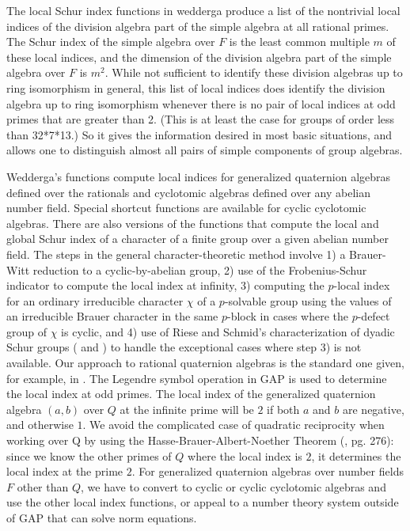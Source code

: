 \documentclass[a4paper,11pt]{report}
\begin{document}
{{ The local Schur index functions in wedderga produce a list of the nontrivial
local indices of the division algebra part of the simple algebra at all
rational primes. The Schur index of the simple algebra over $F$ is the least common multiple $m$ of these local indices, and the dimension of the division algebra part of the
simple algebra over $F$ is $m^2$. While not sufficient to identify these division algebras up to ring
isomorphism in general, this list of local indices does identify the division
algebra up to ring isomorphism whenever there is no pair of local indices at
odd primes that are greater than 2. (This is at least the case for groups of
order less than 3\texttt{}2*7*13.) So it gives the information
desired in most basic situations, and allows one to distinguish almost all
pairs of simple components of group algebras. 

 Wedderga's functions compute local indices for generalized quaternion algebras
defined over the rationals and cyclotomic algebras defined over any abelian
number field. Special shortcut functions are available for cyclic cyclotomic
algebras. There are also versions of the functions that compute the local and
global Schur index of a character of a finite group over a given abelian
number field. The steps in the general character-theoretic method involve 1) a
Brauer-Witt reduction to a cyclic-by-abelian group, 2) use of the
Frobenius-Schur indicator to compute the local index at infinity, 3) computing
the $p$-local index for an ordinary irreducible character $\chi$ of a $p$-solvable group using the values of an irreducible Brauer character in the
same $p$-block in cases where the $p$-defect group of $\chi$ is cyclic, and 4) use of Riese and Schmid's characterization of dyadic Schur
groups (\cite{Sch} and \cite{RSch}) to handle the exceptional cases where step 3) is not available. Our approach
to rational quaternion algebras is the standard one given, for example, in \cite{Pi}. The Legendre symbol operation in GAP is used to determine the local index at
odd primes. The local index of the generalized quaternion algebra $(a,b)$ over $Q$ at the infinite prime will be $2$ if both $a$ and $b$ are negative, and otherwise $1$. We avoid the complicated case of quadratic reciprocity when working over Q
by using the Hasse-Brauer-Albert-Noether Theorem (\cite{R}, pg. 276): since we know the other primes of $Q$ where the local index is $2$, it determines the local index at the prime $2$. For generalized quaternion algebras over number fields $F$ other than $Q$, we have to convert to cyclic or cyclic cyclotomic algebras and use the other
local index functions, or appeal to a number theory system outside of GAP that
can solve norm equations. 

}}
\end{document}
